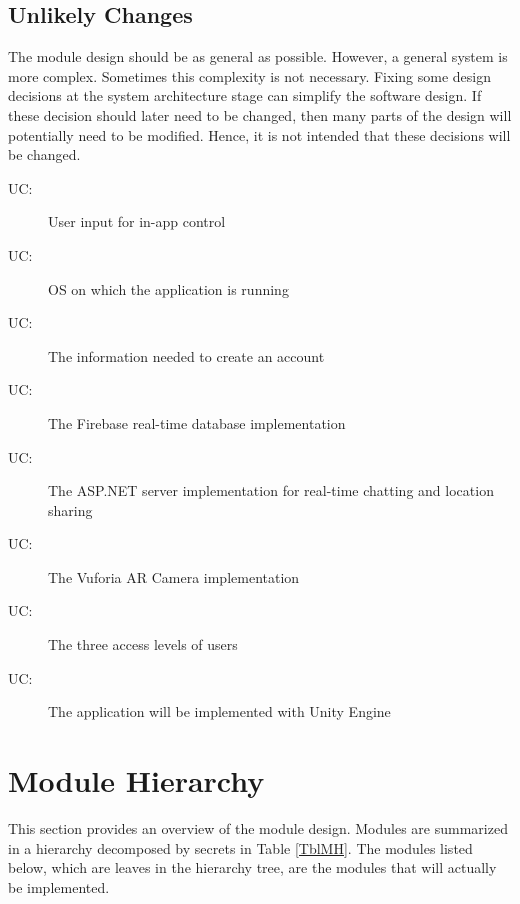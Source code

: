 \documentclass[12pt, titlepage]{article}
\newcounter{ucnum}
\newcommand{\uctheucnum}{UC\theucnum}
\begin{document}
\subsection{Unlikely Changes} \label{SecUchange}

The module design should be as general as possible. However, a general system is
more complex. Sometimes this complexity is not necessary. Fixing some design
decisions at the system architecture stage can simplify the software design. If
these decision should later need to be changed, then many parts of the design
will potentially need to be modified. Hence, it is not intended that these
decisions will be changed.

\begin{description}
\item[ \uctheucnum \label{ucInput}:]User input for in-app control
\item[ \uctheucnum \label{ucOS}:]OS on which the application is running
\item[ \uctheucnum \label{ucAccount}:]The information needed to create an account
\item[ \uctheucnum \label{ucDB}:]The Firebase real-time database implementation
\item[ \uctheucnum \label{ucBackend}:]The ASP.NET server implementation for real-time chatting and location sharing
\item[ \uctheucnum \label{ucAR}:]The Vuforia AR Camera implementation
\item[ \uctheucnum \label{ucAccess}:]The three access levels of users
\item[ \uctheucnum \label{ucUnity}:]The application will be implemented with Unity Engine
\end{description}

\section{Module Hierarchy} \label{SecMH}

This section provides an overview of the module design. Modules are summarized
in a hierarchy decomposed by secrets in Table \ref{TblMH}. The modules listed
below, which are leaves in the hierarchy tree, are the modules that will
actually be implemented.
\end{document}
